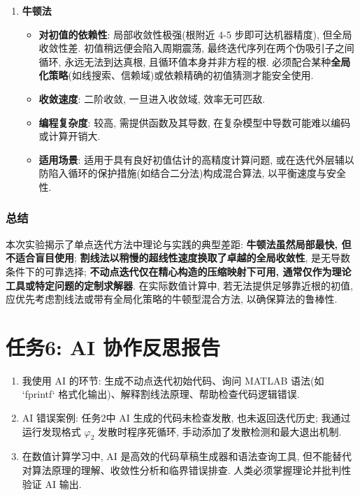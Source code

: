 \documentclass[zihao=-4,a4paper]{ctexart}
\begin{document}
\begin{enumerate}
    \item \textbf{牛顿法}
    \begin{itemize}[rightmargin=0.5cm]
        \item \textbf{对初值的依赖性}: 局部收敛性极强(根附近 4-5 步即可达机器精度), 但全局收敛性差. 初值稍远便会陷入周期震荡, 最终迭代序列在两个伪吸引子之间循环, 永远无法到达真根, 且循环值本身并非方程的根. 必须配合某种\textbf{全局化策略}(如线搜索、信赖域)或依赖精确的初值猜测才能安全使用. 
        \item \textbf{收敛速度}: 二阶收敛, 一旦进入收敛域, 效率无可匹敌. 
        \item \textbf{编程复杂度}: 较高, 需提供函数及其导数, 在复杂模型中导数可能难以编码或计算开销大. 
        \item \textbf{适用场景}: 适用于具有良好初值估计的高精度计算问题, 或在迭代外层辅以防陷入循环的保护措施(如结合二分法)构成混合算法, 以平衡速度与安全性. 
    \end{itemize}
\end{enumerate}

\subsubsection*{总结}

本次实验揭示了单点迭代方法中理论与实践的典型差距: \textbf{牛顿法虽然局部最快, 但不适合盲目使用}; \textbf{割线法以稍慢的超线性速度换取了卓越的全局收敛性}, 是无导数条件下的可靠选择; \textbf{不动点迭代仅在精心构造的压缩映射下可用, 通常仅作为理论工具或特定问题的定制求解器}. 在实际数值计算中, 若无法提供足够靠近根的初值, 应优先考虑割线法或带有全局化策略的牛顿型混合方法, 以确保算法的鲁棒性. 

\section{任务6: AI 协作反思报告}
\begin{enumerate}[rightmargin=0.5cm]
    \item 我使用 AI 的环节: 生成不动点迭代初始代码、询问 MATLAB 语法(如 `fprintf` 格式化输出)、解释割线法原理、帮助检查代码逻辑错误. 
    \item AI 错误案例: 任务2中 AI 生成的代码未检查发散, 也未返回迭代历史; 我通过运行发现格式 $\varphi_2$ 发散时程序死循环, 手动添加了发散检测和最大退出机制. 
    \item 在数值计算学习中, AI 是高效的代码草稿生成器和语法查询工具, 但不能替代对算法原理的理解、收敛性分析和临界错误排查. 人类必须掌握理论并批判性验证 AI 输出. 
\end{enumerate}
\end{document}
